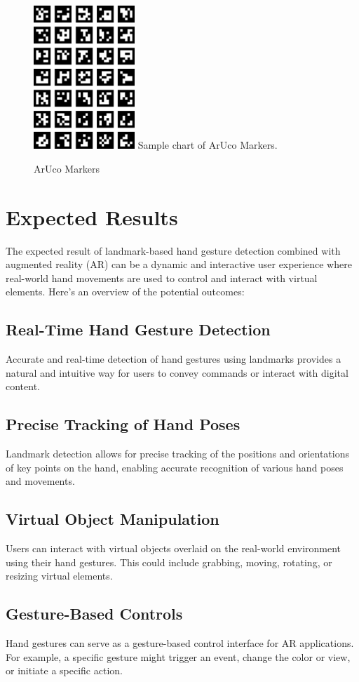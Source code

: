 \documentclass[journal]{IEEEtran}
\begin{document}
\begin{figure}[!t]
  \centering
  \includegraphics[width=1.5in]{photo/aruco-markers.png}
  Sample chart of ArUco Markers.
  \caption{ArUco Markers}
  \label{fig_sim}
\end{figure}

\section{Expected Results}

The expected result of landmark-based hand gesture detection combined with augmented reality (AR) can be a dynamic and interactive 
user experience where real-world hand movements are used to control and interact with virtual elements. 
Here's an overview of the potential outcomes:
\subsection*{Real-Time Hand Gesture Detection}
Accurate and real-time detection of hand gestures using landmarks provides a natural and intuitive way for users to convey commands or 
interact with digital content.
\subsection*{Precise Tracking of Hand Poses}
Landmark detection allows for precise tracking of the positions and orientations of key points on the hand, enabling accurate 
recognition of various hand poses and movements.
\subsection*{Virtual Object Manipulation}
Users can interact with virtual objects overlaid on the real-world environment using their hand gestures. This could include 
grabbing, moving, rotating, or resizing virtual elements.
\subsection*{Gesture-Based Controls}
Hand gestures can serve as a gesture-based control interface for AR applications. For example, a specific gesture might trigger 
an event, change the color or view, or initiate a specific action.
\end{document}
